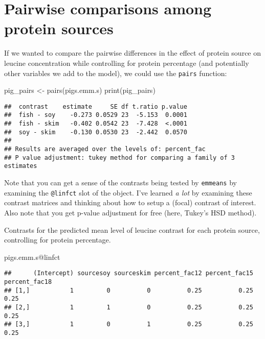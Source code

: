 \documentclass[
]{book}
\newenvironment{Shaded}{\begin{snugshade}}{\end{snugshade}}
\newcommand{\FunctionTok}[1]{\textcolor[rgb]{0.00,0.00,0.00}{#1}}
\newcommand{\NormalTok}[1]{#1}
\newcommand{\OtherTok}[1]{\textcolor[rgb]{0.56,0.35,0.01}{#1}}
\newcommand{\SpecialCharTok}[1]{\textcolor[rgb]{0.00,0.00,0.00}{#1}}
\begin{document}
\hypertarget{pairwise-comparisons-among-protein-sources}{%
\section{Pairwise comparisons among protein sources}\label{pairwise-comparisons-among-protein-sources}}

If we wanted to compare the pairwise differences in the effect of protein source on leucine concentration while controlling for protein percentage (and potentially other variables we add to the model), we could use the \texttt{pairs} function:

\begin{Shaded}
\begin{Highlighting}[]
\NormalTok{pig\_pairs }\OtherTok{\textless{}{-}} \FunctionTok{pairs}\NormalTok{(pigs.emm.s)}
\FunctionTok{print}\NormalTok{(pig\_pairs)}
\end{Highlighting}
\end{Shaded}

\begin{verbatim}
##  contrast    estimate     SE df t.ratio p.value
##  fish - soy    -0.273 0.0529 23  -5.153  0.0001
##  fish - skim   -0.402 0.0542 23  -7.428  <.0001
##  soy - skim    -0.130 0.0530 23  -2.442  0.0570
## 
## Results are averaged over the levels of: percent_fac 
## P value adjustment: tukey method for comparing a family of 3 estimates
\end{verbatim}

Note that you can get a sense of the contrasts being tested by \texttt{emmeans} by examining the \texttt{@linfct} slot of the object. I've learned \emph{a lot} by examining these contrast matrices and thinking about how to setup a (focal) contrast of interest. Also note that you get p-value adjustment for free (here, Tukey's HSD method).

Contrasts for the predicted mean level of leucine contrast for each protein source, controlling for protein percentage.

\begin{Shaded}
\begin{Highlighting}[]
\NormalTok{pigs.emm.s}\SpecialCharTok{@}\NormalTok{linfct}
\end{Highlighting}
\end{Shaded}

\begin{verbatim}
##      (Intercept) sourcesoy sourceskim percent_fac12 percent_fac15 percent_fac18
## [1,]           1         0          0          0.25          0.25          0.25
## [2,]           1         1          0          0.25          0.25          0.25
## [3,]           1         0          1          0.25          0.25          0.25
\end{verbatim}
\end{document}
